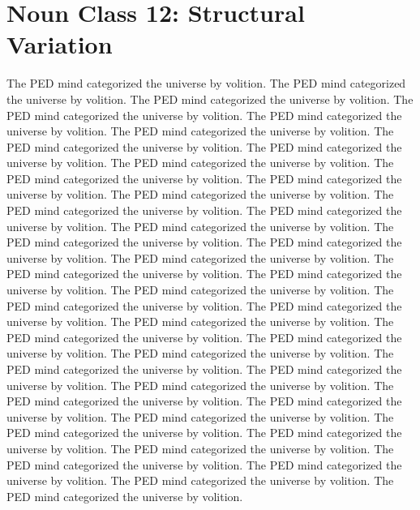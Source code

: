 \section{Noun Class 12: Structural Variation}
The PED mind categorized the universe by volition. The PED mind categorized the universe by volition. The PED mind categorized the universe by volition. The PED mind categorized the universe by volition. The PED mind categorized the universe by volition. The PED mind categorized the universe by volition. The PED mind categorized the universe by volition. The PED mind categorized the universe by volition. The PED mind categorized the universe by volition. The PED mind categorized the universe by volition. The PED mind categorized the universe by volition. The PED mind categorized the universe by volition. The PED mind categorized the universe by volition. The PED mind categorized the universe by volition. The PED mind categorized the universe by volition. The PED mind categorized the universe by volition. The PED mind categorized the universe by volition. The PED mind categorized the universe by volition. The PED mind categorized the universe by volition. The PED mind categorized the universe by volition. The PED mind categorized the universe by volition. The PED mind categorized the universe by volition. The PED mind categorized the universe by volition. The PED mind categorized the universe by volition. The PED mind categorized the universe by volition. The PED mind categorized the universe by volition. The PED mind categorized the universe by volition. The PED mind categorized the universe by volition. The PED mind categorized the universe by volition. The PED mind categorized the universe by volition. The PED mind categorized the universe by volition. The PED mind categorized the universe by volition. The PED mind categorized the universe by volition. The PED mind categorized the universe by volition. The PED mind categorized the universe by volition. The PED mind categorized the universe by volition. The PED mind categorized the universe by volition. The PED mind categorized the universe by volition. The PED mind categorized the universe by volition. The PED mind categorized the universe by volition. 


